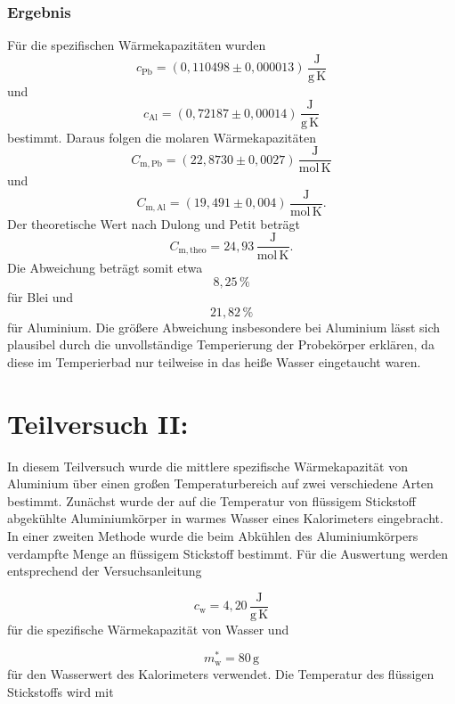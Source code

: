 \documentclass{report}
\begin{document}
\subsubsection{Ergebnis}
\noindent
Für die spezifischen Wärmekapazitäten wurden
\[
\boxed{
c_\mathrm{Pb}
=
(0{,}110498\pm0{,}000013)
\,\frac{\mathrm{J}}{\mathrm{g\,K}}
}
\]
\noindent
und
\[
\boxed{
c_\mathrm{Al}
=
(0{,}72187\pm0{,}00014)
\,\frac{\mathrm{J}}{\mathrm{g\,K}}
}
\]
\noindent
bestimmt.
\noindent
Daraus folgen die molaren Wärmekapazitäten
\[
\boxed{
C_{\mathrm{m,Pb}}
=
(22{,}8730\pm0{,}0027)
\,\frac{\mathrm{J}}{\mathrm{mol\,K}}
}
\]
\noindent
und
\[
\boxed{
C_{\mathrm{m,Al}}
=
(19{,}491\pm0{,}004)
\,\frac{\mathrm{J}}{\mathrm{mol\,K}}
}.
\]
\noindent
Der theoretische Wert nach Dulong und Petit beträgt
\[
C_{\mathrm{m,theo}}
=
24{,}93\,\frac{\mathrm{J}}{\mathrm{mol\,K}}.
\]
\noindent
Die Abweichung beträgt somit etwa
\[
8{,}25\,\%
\]
\noindent
für Blei und
\[
21{,}82\,\%
\]
\noindent
für Aluminium.
\noindent
Die größere Abweichung insbesondere bei Aluminium lässt sich plausibel
durch die unvollständige Temperierung der Probekörper erklären, da diese
im Temperierbad nur teilweise in das heiße Wasser eingetaucht waren.






\newpage
\section{Teilversuch II: }
\noindent
In diesem Teilversuch wurde die mittlere spezifische Wärmekapazität von Aluminium
über einen großen Temperaturbereich auf zwei verschiedene Arten bestimmt. Zunächst
wurde der auf die Temperatur von flüssigem Stickstoff abgekühlte Aluminiumkörper in
warmes Wasser eines Kalorimeters eingebracht. In einer zweiten Methode wurde die
beim Abkühlen des Aluminiumkörpers verdampfte Menge an flüssigem Stickstoff
bestimmt.
\noindent
Für die Auswertung werden entsprechend der Versuchsanleitung

\begin{equation}
c_\mathrm{w}
=
4{,}20\,\frac{\mathrm{J}}{\mathrm{g\,K}}
\end{equation}
\noindent
\noindent
für die spezifische Wärmekapazität von Wasser und

\begin{equation}
m_\mathrm{w}^{*}=80\,\mathrm{g}
\end{equation}
\noindent
für den Wasserwert des Kalorimeters verwendet. Die Temperatur des flüssigen
Stickstoffs wird mit
\end{document}
